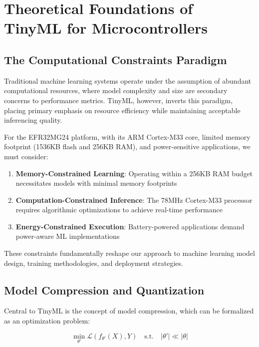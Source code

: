\documentclass[
  9pt,
  letterpaper,
  abstract,
  titlepage]{scrbook}
\providecommand{\tightlist}{%
  \setlength{\itemsep}{0pt}\setlength{\parskip}{0pt}}\usepackage{longtable,booktabs,array}
\def\tightlist{}
\let\tightlist\relax
\begin{document}
\section{Theoretical Foundations of TinyML for
Microcontrollers}\label{theoretical-foundations-of-tinyml-for-microcontrollers}

\subsection{The Computational Constraints
Paradigm}\label{the-computational-constraints-paradigm}

Traditional machine learning systems operate under the assumption of
abundant computational resources, where model complexity and size are
secondary concerns to performance metrics. TinyML, however, inverts this
paradigm, placing primary emphasis on resource efficiency while
maintaining acceptable inferencing quality.

For the EFR32MG24 platform, with its ARM Cortex-M33 core, limited memory
footprint (1536KB flash and 256KB RAM), and power-sensitive
applications, we must consider:

\begin{enumerate}
\def\labelenumi{\arabic{enumi}.}
\tightlist
\item
  \textbf{Memory-Constrained Learning}: Operating within a 256KB RAM
  budget necessitates models with minimal memory footprints
\item
  \textbf{Computation-Constrained Inference}: The 78MHz Cortex-M33
  processor requires algorithmic optimizations to achieve real-time
  performance
\item
  \textbf{Energy-Constrained Execution}: Battery-powered applications
  demand power-aware ML implementations
\end{enumerate}

These constraints fundamentally reshape our approach to machine learning
model design, training methodologies, and deployment strategies.

\subsection{Model Compression and
Quantization}\label{model-compression-and-quantization}

Central to TinyML is the concept of model compression, which can be
formalized as an optimization problem:

\[\min_{\theta'} \mathcal{L}(f_{\theta'}(X), Y) \quad \text{s.t.} \quad |\theta'| \ll |\theta|\]
\end{document}
